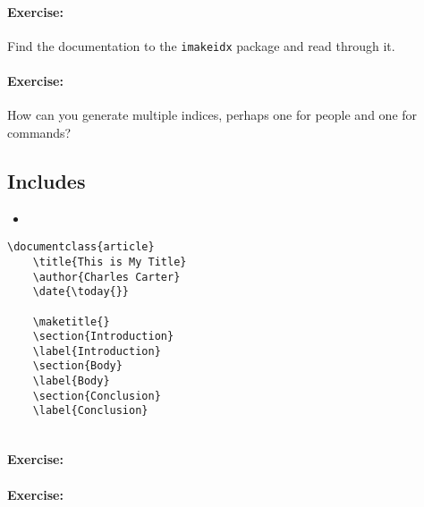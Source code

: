         \paragraph{Exercise:} Find the documentation to the \texttt{imakeidx} package and read through it.

        \paragraph{Exercise:} How can you generate multiple indices, perhaps one for people and one for commands?

        \subsection{Includes}
        \label{Includes}
        
        \begin{cmd}
            \begin{itemize}
                \item{}
            \end{itemize}
        \end{cmd}


        \begin{verbatim}
\documentclass{article}
    \title{This is My Title}
    \author{Charles Carter}
    \date{\today{}}
 
    \maketitle{}
    \section{Introduction}
    \label{Introduction}
    \section{Body}
    \label{Body}
    \section{Conclusion}
    \label{Conclusion}
    
        \end{verbatim}

        \paragraph{Exercise:}

        \paragraph{Exercise:}
        
